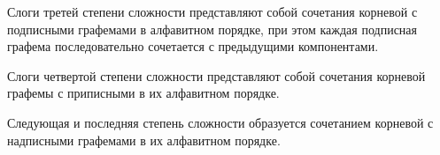 Слоги третей степени сложности представляют собой сочетания корневой с подписными графемами в алфавитном порядке, при этом каждая подписная графема последовательно сочетается с предыдущими компонентами.

Слоги четвертой степени сложности представляют собой сочетания корневой графемы с приписными в их алфавитном порядке.

Следующая и последняя степень сложности образуется сочетанием корневой с надписными графемами в их алфавитном порядке.
